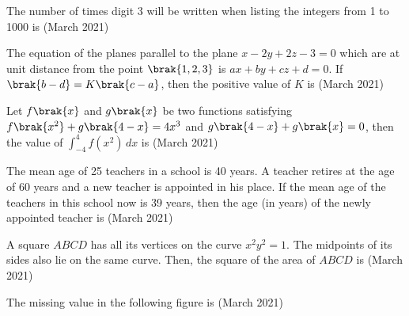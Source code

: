 
\iffalse


\title{assignment}
\author{EE24BTECH11020}
\section{integer}
\fi


\item The number of times digit 3 will be written when listing the integers from 1 to 1000 is \underline{\hspace{1cm}}\hfill (March 2021)
\\ 
\item The equation of the planes parallel to the plane $x - 2y + 2z - 3 = 0$ which are at unit distance from the point $\brak{1, 2, 3}$ is $ax + by + cz + d = 0$. If $\brak{b - d} = K\brak{c - a}$, then the positive value of $K$ is \underline{\hspace{1cm}}\hfill (March 2021)
\\
\item Let $f\brak{x}$ and $g\brak{x}$ be two functions satisfying $f\brak{x^2} + g\brak{4 - x} = 4x^3$ and $g\brak{4 - x} + g\brak{x} = 0$, then the value of $\int_{-4}^{4} f(x^2) \, dx$ is \underline{\hspace{1cm}}\hfill (March 2021)
\\
\item The mean age of 25 teachers in a school is 40 years. A teacher retires at the age of 60 years and a new teacher is appointed in his place. If the mean age of the teachers in this school now is 39 years, then the age (in years) of the newly appointed teacher is \underline{\hspace{1cm}}\hfill (March 2021)
\\

\item A square $ABCD$ has all its vertices on the curve $x^2y^2 = 1$. The midpoints of its sides also lie on the same curve. Then, the square of the area of $ABCD$ is \underline{\hspace{1cm}}\hfill (March 2021)
\\
\item The missing value in the following figure is \underline{\hspace{1cm}}\hfill (March 2021)



